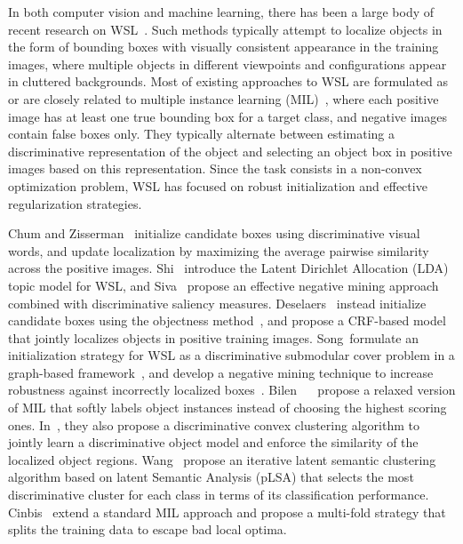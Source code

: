 

In both computer vision and machine learning, there has been a large body of recent research on WSL~\cite{Anonymous:2007fd,shi2012transfer,siva2012defence,Deselaers:2012ci,Siva2013,song2014learning,song14slsvm,bilen2014weakly,bilen2015weakly,Wang:2014tg,Cinbis:2015wn,Oquab:2015us,Bilen:2015uo,Jaderberg:2015vo,Zhou:2015wx}. 
Such methods typically attempt
to localize objects in the form of bounding boxes with visually consistent
appearance in the training images, where multiple objects in different viewpoints
and configurations appear in cluttered backgrounds.  Most of existing approaches
to WSL are formulated as or are closely related to multiple instance learning
(MIL)~\cite{long1998pac}, where each positive image has at least one true
bounding box for a target class, and negative images contain false boxes only.
They typically alternate between
estimating a discriminative representation of the object and selecting an object
box in positive images based on this representation. Since the task consists
in a non-convex optimization problem, WSL has focused on robust initialization
and effective regularization strategies. 

Chum and Zisserman~\cite{Anonymous:2007fd} initialize candidate boxes 
using discriminative visual words, and  update localization by maximizing
the average pairwise similarity across the positive images.
Shi~\etal\cite{shi2012transfer} introduce  %
the Latent Dirichlet Allocation (LDA) topic model for WSL, and 
Siva~\etal\cite{siva2012defence} %
propose an effective negative mining approach combined
with discriminative saliency measures.  Deselaers~\etal\cite{Deselaers:2012ci} instead
initialize candidate boxes using the objectness method~\cite{Anonymous:2012kg}, 
and %
propose a CRF-based model that jointly localizes objects in positive training
images. %
Song~\etal formulate 
an initialization strategy for WSL as a discriminative submodular cover problem in
a graph-based framework~\cite{song2014learning}, and develop a negative mining technique to increase robustness against incorrectly localized boxes~\cite{song14slsvm}.  Bilen~\etal
~\cite{bilen2014weakly} propose a relaxed version of MIL that softly
labels object instances instead of choosing the highest scoring ones.
In~\cite{bilen2015weakly}, they also propose a discriminative convex clustering
algorithm to jointly learn a discriminative object model and enforce the
similarity of the localized object regions.
Wang~\etal\cite{Wang:2014tg} propose an iterative latent semantic
clustering algorithm based on latent Semantic Analysis (pLSA) that 
selects the most discriminative cluster for each class in terms of its
classification performance. 
Cinbis~\etal\cite{Cinbis:2015wn} extend a standard MIL approach and propose a
multi-fold strategy that splits the training data to escape bad local optima. 

